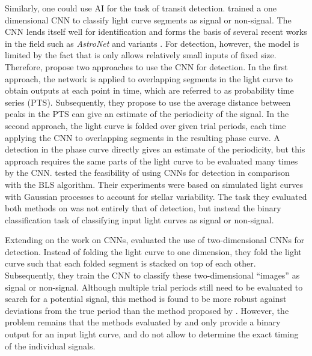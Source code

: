 Similarly, one could use AI for the task of transit detection. \cite{pearson2018searching} trained a one dimensional CNN to classify light curve segments as signal or non-signal. The CNN lends itself well for identification and forms the basis of several recent works in the field such as \textit{AstroNet} \citep{shallue2018identifying} and variants \citep{ansdell2018scientific, dattilo2019identifying, koning2019reducing, yu2019identifying, osborn2020rapid}. For detection, however, the model is limited by the fact that is only allows relatively small inputs of fixed size. Therefore, \cite{pearson2018searching} propose two approaches to use the CNN for detection. In the first approach, the network is applied to overlapping segments in the light curve to obtain outputs at each point in time, which are referred to as probability time series (PTS). Subsequently, they propose to use the average distance between peaks in the PTS can give an estimate of the periodicity of the signal. In the second approach, the light curve is folded over given trial periods, each time applying the CNN to overlapping segments in the resulting phase curve. A detection in the phase curve directly gives an estimate of the periodicity, but this approach requires the same parts of the light curve to be evaluated many times by the CNN. \cite{zucker2018shallow} tested the feasibility of using CNNs for detection in comparison with the BLS algorithm. Their experiments were based on simulated light curves with Gaussian processes to account for stellar variability. The task they evaluated both methods on was not entirely that of detection, but instead the binary classification task of classifying input light curves as signal or non-signal.

Extending on the work on CNNs, \cite{chintarungruangchai2019detecting} evaluated the use of two-dimensional CNNs for detection. Instead of folding the light curve to one dimension, they fold the light curve such that each folded segment is stacked on top of each other. Subsequently, they train the CNN to classify these two-dimensional ``images'' as signal or non-signal. Although multiple trial periods still need to be evaluated to search for a potential signal, this method is found to be more robust against deviations from the true period than the method proposed by \cite{pearson2018searching}. However, the problem remains that the methods evaluated by \cite{chintarungruangchai2019detecting} and \cite{zucker2018shallow} only provide a binary output for an input light curve, and do not allow to determine the exact timing of the individual signals.